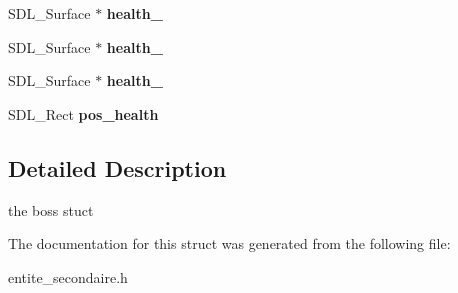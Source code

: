 \begin{DoxyCompactItemize}
\item 
\mbox{\label{structBoss_a5e267a56ed1bb879225eda32f0840709}} 
S\+D\+L\+\_\+\+Surface $\ast$ {\bfseries health\+\_}
\item 
\mbox{\label{structBoss_a79ae6a499c2a1d4612c13647daeef0e6}} 
S\+D\+L\+\_\+\+Surface $\ast$ {\bfseries health\+\_}
\item 
\mbox{\label{structBoss_ac6a96200cdc211f117c3cc83b15b1150}} 
S\+D\+L\+\_\+\+Surface $\ast$ {\bfseries health\+\_}
\item 
\mbox{\label{structBoss_ac589e0fccda69d672f8510adf3520e7e}} 
S\+D\+L\+\_\+\+Rect {\bfseries pos\+\_\+health}
\end{DoxyCompactItemize}


\subsection{Detailed Description}
the boss stuct 

The documentation for this struct was generated from the following file\+:\begin{DoxyCompactItemize}
\item 
entite\+\_\+secondaire.\+h\end{DoxyCompactItemize}
